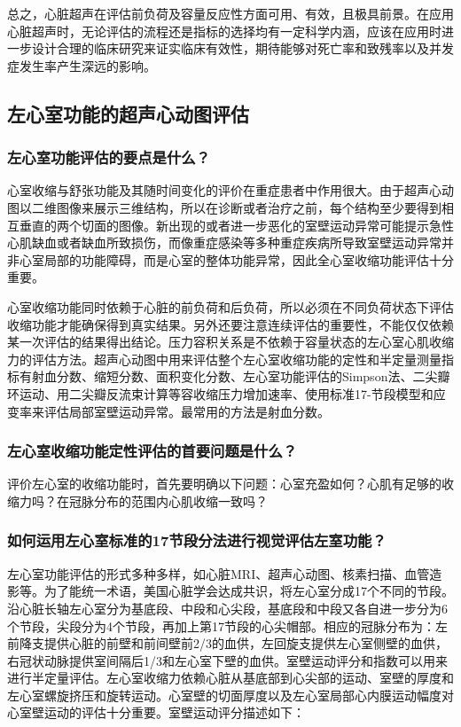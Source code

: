 总之，心脏超声在评估前负荷及容量反应性方面可用、有效，且极具前景。在应用心脏超声时，无论评估的流程还是指标的选择均有一定科学内涵，应该在应用时进一步设计合理的临床研究来证实临床有效性，期待能够对死亡率和致残率以及并发症发生率产生深远的影响。

\subsection{左心室功能的超声心动图评估}

\subsubsection{左心室功能评估的要点是什么？}

心室收缩与舒张功能及其随时间变化的评价在重症患者中作用很大。由于超声心动图以二维图像来展示三维结构，所以在诊断或者治疗之前，每个结构至少要得到相互垂直的两个切面的图像。新出现的或者进一步恶化的室壁运动异常可能提示急性心肌缺血或者缺血所致损伤，而像重症感染等多种重症疾病所导致室壁运动异常并非心室局部的功能障碍，而是心室的整体功能异常，因此全心室收缩功能评估十分重要。

心室收缩功能同时依赖于心脏的前负荷和后负荷，所以必须在不同负荷状态下评估收缩功能才能确保得到真实结果。另外还要注意连续评估的重要性，不能仅仅依赖某一次评估的结果得出结论。压力容积关系是不依赖于容量状态的左心室心肌收缩力的评估方法。超声心动图中用来评估整个左心室收缩功能的定性和半定量测量指标有射血分数、缩短分数、面积变化分数、左心室功能评估的Simpson法、二尖瓣环运动、用二尖瓣反流束计算等容收缩压力增加速率、使用标准17-节段模型和应变率来评估局部室壁运动异常。最常用的方法是射血分数。

\subsubsection{左心室收缩功能定性评估的首要问题是什么？}

评价左心室的收缩功能时，首先要明确以下问题：心室充盈如何？心肌有足够的收缩力吗？在冠脉分布的范围内心肌收缩一致吗？

\subsubsection{如何运用左心室标准的17节段分法进行视觉评估左室功能？}

左心室功能评估的形式多种多样，如心脏MRI、超声心动图、核素扫描、血管造影等。为了能统一术语，美国心脏学会达成共识，将左心室分成17个不同的节段。沿心脏长轴左心室分为基底段、中段和心尖段，基底段和中段又各自进一步分为6个节段，尖段分为4个节段，再加上第17节段的心尖帽部。相应的冠脉分布为：左前降支提供心脏的前壁和前间壁前2/3的血供，左回旋支提供左心室侧壁的血供，右冠状动脉提供室间隔后1/3和左心室下壁的血供。室壁运动评分和指数可以用来进行半定量评估。左心室收缩力依赖心脏从基底部到心尖部的运动、室壁的厚度和左心室螺旋挤压和旋转运动。心室壁的切面厚度以及左心室局部心内膜运动幅度对心室壁运动的评估十分重要。室壁运动评分描述如下：

